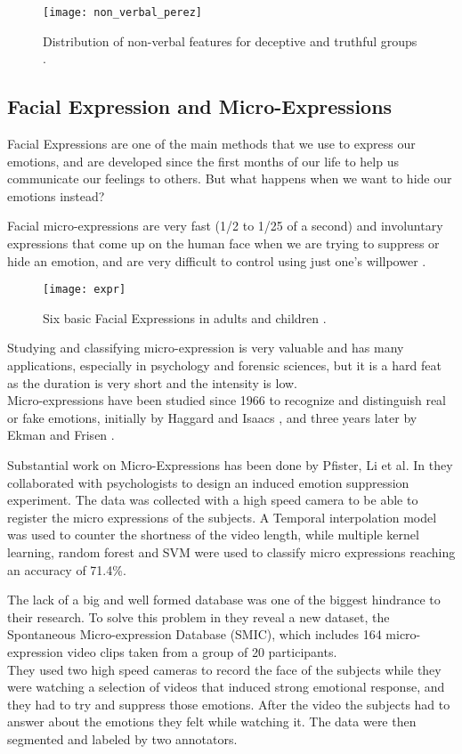 \begin{figure}[H]
	\centering
	\texttt{[image: non\_verbal\_perez]}
	\caption{Distribution of non-verbal features for deceptive and truthful groups \cite{Perez-Rosas:2015:DDU:2818346.2820758}.}
\end{figure}

\subsection{Facial Expression and Micro-Expressions}
Facial Expressions are one of the main methods that we use to express our emotions, and are developed since the first months of our life to help us communicate our feelings to others. But what happens when we want to hide our emotions instead? 

Facial micro-expressions are very fast (1/2 to 1/25 of a second) and involuntary expressions that come up on the human face when we are trying to suppress or hide an emotion, and are very difficult to control using just one's willpower \cite{EkmanER}.

\begin{figure}[H]
	\centering
	\texttt{[image: expr]}
	\caption{Six basic Facial Expressions in adults and children \cite{baby_fe}.}
\end{figure}

Studying and classifying micro-expression is very valuable and has many applications, especially in psychology and forensic sciences, but it is a hard feat as the duration is very short and the intensity is low.\\ 
Micro-expressions have been studied since 1966 to recognize and distinguish real or fake emotions, initially by Haggard and Isaacs \cite{Haggard}, and three years later by Ekman and Frisen \cite{EkmanLeakage}.

Substantial work on Micro-Expressions has been done by Pfister, Li et al. In \cite{pfister2011micro} they collaborated with psychologists to design an induced emotion suppression experiment. The data was collected with a high speed camera to be able to register the micro expressions of the subjects. A Temporal interpolation model was used to counter the shortness of the video length, while multiple kernel learning, random forest and SVM were used to classify micro expressions reaching an accuracy of 71.4\%.

The lack of a big and well formed database was one of the biggest hindrance to their research. To solve this problem in \cite{xli2012spontaneous} they reveal a new dataset, the Spontaneous Micro-expression Database (SMIC), which includes 164 micro-expression video clips taken from a group of 20 participants.\\
They used two high speed cameras to record the face of the subjects while they were watching a selection of videos that induced strong emotional response, and they had to try and suppress those emotions. After the video the subjects had to answer about the emotions they felt while watching it. The data were then segmented and labeled by two annotators.


